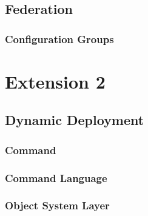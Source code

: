 \documentclass[a4paper]{article}
\begin{document}
\subsection{Federation}
\subsubsection{Configuration Groups}

\section{Extension 2}
\subsection{Dynamic Deployment}
\subsubsection{Command}
\subsubsection{Command Language}
\subsubsection{Object System Layer}

\newpage


\end{document}
